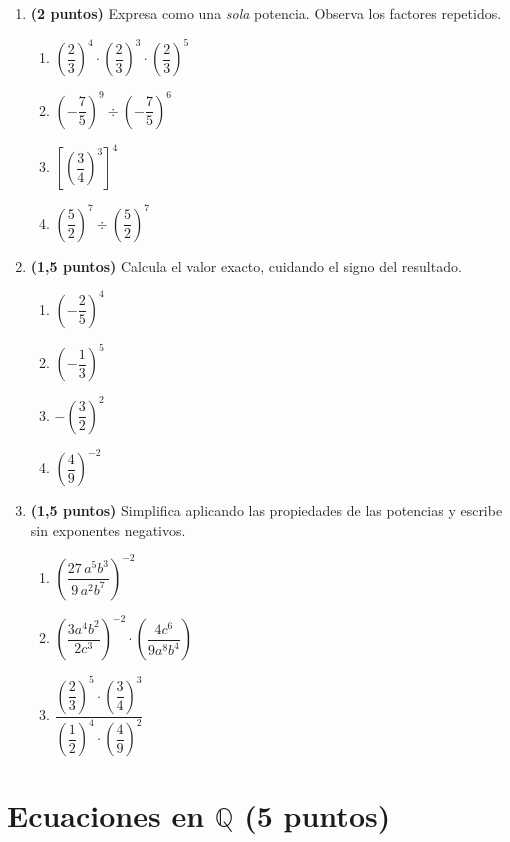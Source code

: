 \documentclass[12pt, letterpaper]{article}
\newcommand{\Q}{\mathbb{Q}}
\begin{document}
\begin{enumerate}[leftmargin=*, resume]

  \item \textbf{(2 puntos)} Expresa como una \emph{sola} potencia. Observa los factores repetidos.
        \begin{enumerate}[label=\alph*), leftmargin=*]
          \item $\left(\dfrac{2}{3}\right)^4 \cdot \left(\dfrac{2}{3}\right)^3 \cdot \left(\dfrac{2}{3}\right)^5$
          \item $\left(-\dfrac{7}{5}\right)^9 \div \left(-\dfrac{7}{5}\right)^6$
          \item $\left[\left(\dfrac{3}{4}\right)^3\right]^4$
          \item $\left(\dfrac{5}{2}\right)^7 \div \left(\dfrac{5}{2}\right)^7$
        \end{enumerate}

  \item \textbf{(1,5 puntos)} Calcula el valor exacto, cuidando el signo del resultado.
        \begin{enumerate}[label=\alph*), leftmargin=*]
          \item $\left(-\dfrac{2}{5}\right)^4$
          \item $\left(-\dfrac{1}{3}\right)^5$
          \item $-\left(\dfrac{3}{2}\right)^2$
          \item $\left(\dfrac{4}{9}\right)^{-2}$
        \end{enumerate}

  \item \textbf{(1,5 puntos)} Simplifica aplicando las propiedades de las potencias y escribe sin exponentes negativos.
        \begin{enumerate}[label=\alph*), leftmargin=*]
          \item $\left(\dfrac{27\,a^5 b^3}{9\,a^2 b^7}\right)^{-2}$
          \item $\left(\dfrac{3 a^4 b^2}{2 c^3}\right)^{-2} \cdot \left(\dfrac{4 c^6}{9 a^8 b^4}\right)$
          \item $\dfrac{\left(\dfrac{2}{3}\right)^5 \cdot \left(\dfrac{3}{4}\right)^3}{\left(\dfrac{1}{2}\right)^4 \cdot \left(\dfrac{4}{9}\right)^2}$
        \end{enumerate}

\end{enumerate}

\section{Ecuaciones en $\Q$ (5 puntos)}
\end{document}
